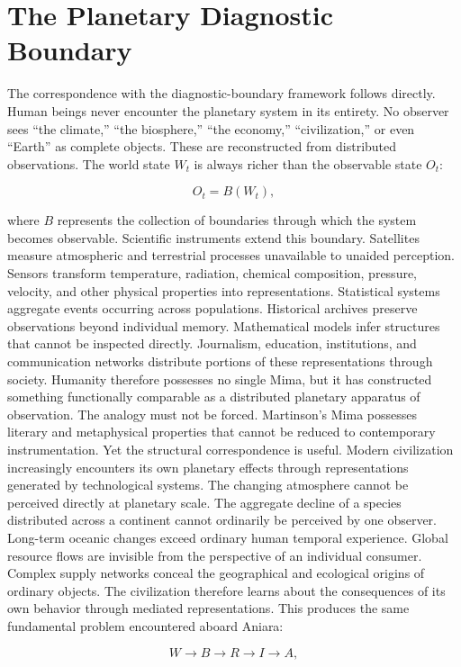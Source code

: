 \documentclass[11pt,oneside]{book}
\theoremstyle{definition}
\theoremstyle{remark}
\begin{document}
\section*{The Planetary Diagnostic Boundary}

The correspondence with the diagnostic-boundary framework follows directly. Human beings never
encounter the planetary system in its entirety. No observer sees ``the climate,'' ``the biosphere,''
``the economy,'' ``civilization,'' or even ``Earth'' as complete objects. These are reconstructed
from distributed observations. The world state \(W_t\) is always richer than the observable state
\(O_t\):

\[
O_t=B(W_t),
\]

where \(B\) represents the collection of boundaries through which the system becomes observable.
Scientific instruments extend this boundary. Satellites measure atmospheric and terrestrial
processes unavailable to unaided perception. Sensors transform temperature, radiation, chemical
composition, pressure, velocity, and other physical properties into representations. Statistical
systems aggregate events occurring across populations. Historical archives preserve observations
beyond individual memory. Mathematical models infer structures that cannot be inspected directly.
Journalism, education, institutions, and communication networks distribute portions of these
representations through society. Humanity therefore possesses no single Mima, but it has constructed
something functionally comparable as a distributed planetary apparatus of observation. The analogy
must not be forced. Martinson's Mima possesses literary and metaphysical properties that cannot be
reduced to contemporary instrumentation. Yet the structural correspondence is useful. Modern
civilization increasingly encounters its own planetary effects through representations generated by
technological systems. The changing atmosphere cannot be perceived directly at planetary scale. The
aggregate decline of a species distributed across a continent cannot ordinarily be perceived by one
observer. Long-term oceanic changes exceed ordinary human temporal experience. Global resource flows
are invisible from the perspective of an individual consumer. Complex supply networks conceal the
geographical and ecological origins of ordinary objects. The civilization therefore learns about the
consequences of its own behavior through mediated representations. This produces the same
fundamental problem encountered aboard Aniara:

\[
W \rightarrow B \rightarrow R \rightarrow I \rightarrow A,
\]
\end{document}
